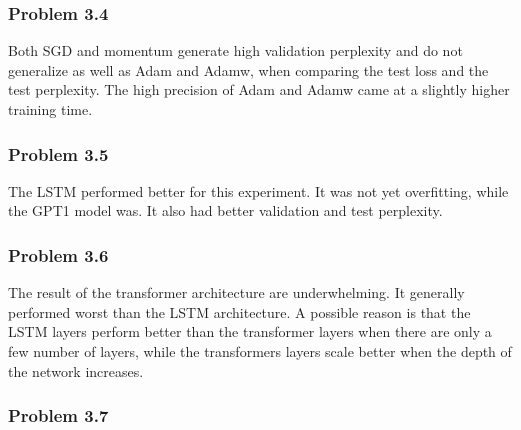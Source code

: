 \documentclass[12pt]{article}
\theoremstyle{definition}
\begin{document}
\subsubsection*{Problem 3.4}
Both SGD and momentum generate high validation perplexity and do not generalize
as well as Adam and Adamw, when comparing the test loss and the test perplexity.
The high precision of Adam and Adamw came at a slightly higher training time.
\subsubsection*{Problem 3.5}
The LSTM performed better for this experiment. It was not yet overfitting, while
the GPT1 model was.  It also had better validation and test perplexity.
\subsubsection*{Problem 3.6}
The result of the transformer architecture are underwhelming. It generally
performed worst than the LSTM architecture. A possible reason is that the LSTM
layers perform better than the transformer layers when there are only a few
number of layers, while the transformers layers scale better when the depth of
the network increases.
\subsubsection*{Problem 3.7}
\end{document}
